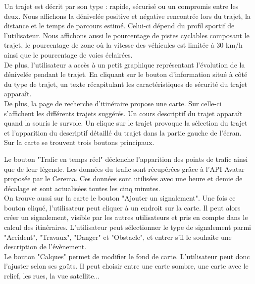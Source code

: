 \noindent Un trajet est décrit par son type : rapide, sécurisé ou un compromis entre les deux.
Nous affichons la dénivelée positive et négative rencontrée lors du trajet, la distance et le temps de parcours estimé.
Celui-ci dépend du profil sportif de l'utilisateur.
Nous affichons aussi le pourcentage de pistes cyclables composant le trajet, le pourcentage de zone où la vitesse des véhicules est limitée à 30 km/h ainsi que le pourcentage de voies éclairées.\\

\noindent De plus, l'utilisateur a accès à un petit graphique représentant l'évolution de la dénivelée pendant le trajet.
En cliquant sur le bouton d'information situé à côté du type de trajet, un texte récapitulant les caractéristiques de sécurité du trajet apparaît.\\

\noindent De plus, la page de recherche d'itinéraire propose une carte.
Sur celle-ci s'affichent les différents trajets suggérés.
Un cours descriptif du trajet apparaît quand la souris le survole.
Un clique sur le trajet provoque la sélection du trajet et l'apparition du descriptif détaillé du trajet dans la partie gauche de l'écran.\\

\noindent Sur la carte se trouvent trois boutons principaux.

\noindent Le bouton "Trafic en temps réel" déclenche l'apparition des points de trafic ainsi que de leur légende.
Les données du trafic sont récupérées grâce à l'API Avatar \cite{Avatar} proposée par le Cerema.
Ces données sont utilisées avec une heure et demie de décalage et sont actualisées toutes les cinq minutes.\\

\noindent On trouve aussi sur la carte le bouton "Ajouter un signalement".
Une fois ce bouton cliqué, l'utilisateur peut cliquer à un endroit sur la carte.
Il peut alors créer un signalement, visible par les autres utilisateurs et pris en compte dans le calcul des itinéraires.
L'utilisateur peut sélectionner le type de signalement parmi "Accident", "Travaux", "Danger" et "Obstacle", et entrer s'il le souhaite une description de l'évènement.\\

\noindent Le bouton "Calques" permet de modifier le fond de carte.
L'utilisateur peut donc l'ajuster selon ses goûts.
Il peut choisir entre une carte sombre, une carte avec le relief, les rues, la vue satellite...

